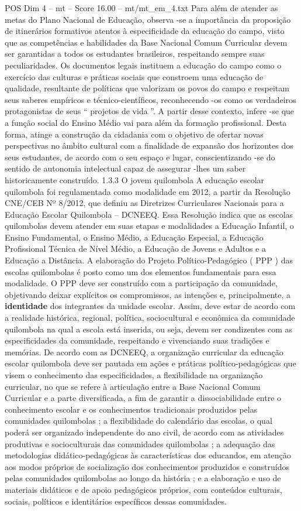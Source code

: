 \begin{textsample}{POS Dim 4 – mt – Score 16.00 – mt/mt\_em\_4.txt}
Para além de atender as metas do Plano Nacional de Educação, observa -se a importância da proposição de itinerários formativos atentos à especificidade da educação do campo, visto que as competências e habilidades da Base Nacional Comum Curricular devem ser garantidas a todos os estudantes brasileiros, respeitando sempre suas peculiaridades.
Os documentos legais instituem a educação do campo como o exercício das culturas e práticas sociais que constroem uma educação de qualidade, resultante de políticas que valorizam os povos do campo e respeitam seus saberes empíricos e técnico-científicos, reconhecendo -os como os verdadeiros protagonistas de seus “ projetos de vida ”.
A partir desse contexto, infere -se que a função social do Ensino Médio vai para além da formação profissional.
Desta forma, atinge a construção da cidadania com o objetivo de ofertar novas perspectivas no âmbito cultural com a finalidade de expansão dos horizontes dos seus estudantes, de acordo com o seu espaço e lugar, conscientizando -se do sentido de autonomia intelectual capaz de assegurar -lhes um saber historicamente construído. 1.3.3 O jovem quilombola A educação escolar quilombola foi regulamentada como modalidade em 2012, a partir da Resolução CNE/CEB Nº 8/2012, que definiu as Diretrizes Curriculares Nacionais para a Educação Escolar Quilombola – DCNEEQ.
Essa Resolução indica que as escolas quilombolas devem atender em suas etapas e modalidades a Educação Infantil, o Ensino Fundamental, o Ensino Médio, a Educação Especial, a Educação Profissional Técnica de Nível Médio, a Educação de Jovens e Adultos e a Educação a Distância.
A elaboração do Projeto Político-Pedagógico ( PPP ) das escolas quilombolas é posto como um dos elementos fundamentais para essa modalidade.
O PPP deve ser construído com a participação da comunidade, objetivando deixar explícitos os compromissos, as intenções e, principalmente, a \textbf{identidade} dos integrantes da unidade escolar.
Assim, deve estar de acordo com a realidade histórica, regional, política, sociocultural e econômica da comunidade quilombola na qual a escola está inserida, ou seja, devem ser condizentes com as especificidades da comunidade, respeitando e vivenciando suas tradições e memórias.
De acordo com as DCNEEQ, a organização curricular da educação escolar quilombola deve ser pautada em ações e práticas político-pedagógicas que visem o conhecimento das especificidades, a flexibilidade na organização curricular, no que se refere à articulação entre a Base Nacional Comum Curricular e a parte diversificada, a fim de garantir a dissociabilidade entre o conhecimento escolar e os conhecimentos tradicionais produzidos pelas comunidades quilombolas ; a flexibilidade do calendário das escolas, o qual poderá ser organizado independente do ano civil, de acordo com as atividades produtivas e socioculturais das comunidades quilombolas ; a adequação das metodologias didático-pedagógicas às características dos educandos, em atenção aos modos próprios de socialização dos conhecimentos produzidos e construídos pelas comunidades quilombolas ao longo da história ; e a elaboração e uso de materiais didáticos e de apoio pedagógicos próprios, com conteúdos culturais, sociais, políticos e identitários específicos dessas comunidades.

\end{textsample}
